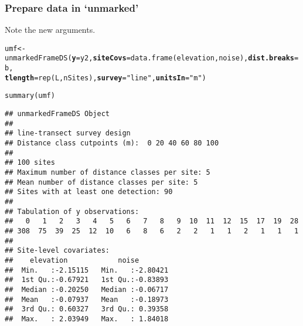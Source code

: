 \documentclass[color=usenames,dvipsnames]{beamer}\usepackage[]{graphicx}\usepackage[]{xcolor}
\makeatletter
\newcommand{\hlstr}[1]{\textcolor[rgb]{0.749,0.012,0.012}{#1}}%
\newcommand{\hlstd}[1]{\textcolor[rgb]{0,0,0}{#1}}%
\newcommand{\hlkwb}[1]{\textcolor[rgb]{0,0.341,0.682}{#1}}%
\newcommand{\hlkwc}[1]{\textcolor[rgb]{0,0,0}{\textbf{#1}}}%
\newcommand{\hlkwd}[1]{\textcolor[rgb]{0.004,0.004,0.506}{#1}}%
\newenvironment{kframe}{%
 \def\at@end@of@kframe{}%
 \ifinner\ifhmode%
  \def\at@end@of@kframe{\end{minipage}}%
  \begin{minipage}{\columnwidth}%
 \fi\fi%
 \def\FrameCommand##1{\hskip\@totalleftmargin \hskip-\fboxsep
 \colorbox{shadecolor}{##1}\hskip-\fboxsep
     \hskip-\linewidth \hskip-\@totalleftmargin \hskip\columnwidth}%
 \MakeFramed {\advance\hsize-\width
   \@totalleftmargin\z@ \linewidth\hsize
   \@setminipage}}%
 {\par\unskip\endMakeFramed%
 \at@end@of@kframe}
\newenvironment{knitrout}{}{} %
\makeatother
\begin{document}
\begin{frame}[fragile]
  \frametitle{Prepare data in `unmarked'}
  \small
  Note the new arguments.
  \vspace{-6pt}
\begin{knitrout}\tiny
{}\color{fgcolor}\begin{kframe}
\begin{alltt}
\hlstd{umf} \hlkwb{<-} \hlkwd{unmarkedFrameDS}\hlstd{(}\hlkwc{y}\hlstd{=y2,} \hlkwc{siteCovs}\hlstd{=}\hlkwd{data.frame}\hlstd{(elevation,noise),} \hlkwc{dist.breaks}\hlstd{=b,}
                       \hlkwc{tlength}\hlstd{=}\hlkwd{rep}\hlstd{(L, nSites),} \hlkwc{survey}\hlstd{=}\hlstr{"line"}\hlstd{,} \hlkwc{unitsIn}\hlstd{=}\hlstr{"m"}\hlstd{)}
\end{alltt}
\end{kframe}
\end{knitrout}
\pause
\begin{knitrout}\tiny
{}\color{fgcolor}\begin{kframe}
\begin{alltt}
\hlkwd{summary}\hlstd{(umf)}
\end{alltt}
\begin{verbatim}
## unmarkedFrameDS Object
## 
## line-transect survey design
## Distance class cutpoints (m):  0 20 40 60 80 100 
## 
## 100 sites
## Maximum number of distance classes per site: 5 
## Mean number of distance classes per site: 5 
## Sites with at least one detection: 90 
## 
## Tabulation of y observations:
##   0   1   2   3   4   5   6   7   8   9  10  11  12  15  17  19  28 
## 308  75  39  25  12  10   6   8   6   2   2   1   1   2   1   1   1 
## 
## Site-level covariates:
##    elevation            noise         
##  Min.   :-2.15115   Min.   :-2.80421  
##  1st Qu.:-0.67921   1st Qu.:-0.83893  
##  Median :-0.20250   Median :-0.06717  
##  Mean   :-0.07937   Mean   :-0.18973  
##  3rd Qu.: 0.60327   3rd Qu.: 0.39358  
##  Max.   : 2.03949   Max.   : 1.84018
\end{verbatim}
\end{kframe}
\end{knitrout}
\end{frame}
\end{document}
